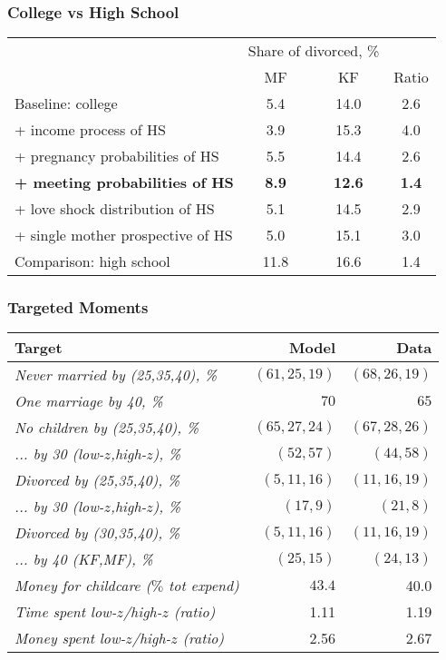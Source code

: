 \documentclass{beamer}
\begin{document}
\begin{frame}
\frametitle{College vs High School}
\begin{center}
\begin{tabular}{|l|c|c|c|}
& \multicolumn{2}{|c|}{Share of divorced, \%} & \\
& MF & KF & Ratio \\
Baseline: college & 5.4 & 14.0 &   2.6  \\
+ income process of HS & 3.9 & 15.3 & 4.0 \\
+ pregnancy probabilities of HS & 5.5 & 14.4 & 2.6 \\
\textbf{+ meeting probabilities of HS} & \textbf{8.9} & \textbf{12.6}  & \textbf{1.4} \\
+ love shock distribution of HS & 5.1 & 14.5 & 2.9 \\
+ single mother prospective of HS & 5.0 & 15.1 &  3.0 \\
Comparison: high school &  11.8 & 16.6 & 1.4\\
\end{tabular}
\end{center}
\end{frame}


\begin{frame}
\frametitle{Targeted Moments}
\begin{tabular}{ l r r}\hline
Target & Model & Data \\\hline
\footnotesize\textit{Never married by (25,35,40), \% }& $(61,25,19)$ &  $(68,26,19)$ \\
\footnotesize \textit{One marriage by 40, \%}  & $70$ & $65$ \\\hline
\footnotesize \textit{No children by (25,35,40), \%}  & $(65,27,24)$ & $(67,28,26)$ \\
\footnotesize \textit{... by 30 (low-$z$,high-$z$), \%}  & $(52,57)$ & $(44,58)$ \\\hline
\footnotesize \textit{Divorced by (25,35,40), \%}  & $(5,11,16)$ & $(11,16,19)$ \\
\footnotesize \textit{... by 30 (low-$z$,high-$z$), \%}  & $(17,9)$ & $(21,8)$ \\\hline
\footnotesize \textit{Divorced by (30,35,40), \%}  & $(5,11,16)$ & $(11,16,19)$ \\
\footnotesize \textit{... by 40 (KF,MF), \%}  & $(25,15)$ & $(24,13)$ \\\hline
\footnotesize \textit{Money for childcare ($\%$ tot expend)} & $43.4$ & 40.0 \\
\footnotesize \textit{Time spent low-$z$/high-$z$ (ratio)} & 1.11 & 1.19 \\
\footnotesize \textit{Money spent low-$z$/high-$z$ (ratio)} & 2.56  & 2.67 \\\hline

\end{tabular}
\end{frame}
\end{document}
